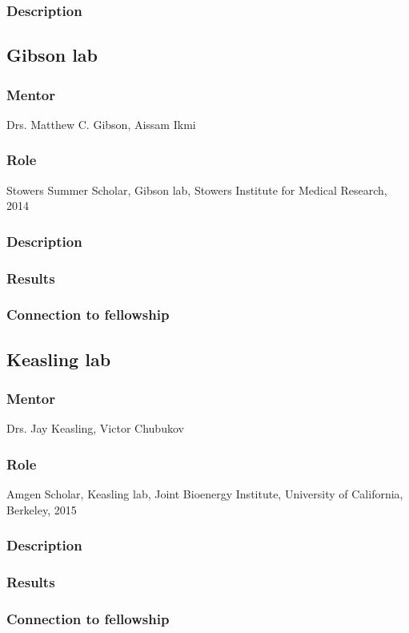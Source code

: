 \documentclass[11pt]{article}
\begin{document}
\subsubsection{Description}
%
\subsection{Gibson lab}
%
\subsubsection{Mentor}
Drs. Matthew C. Gibson, Aissam Ikmi
%
\subsubsection{Role}
Stowers Summer Scholar, Gibson lab, Stowers Institute for Medical Research, 2014
%
\subsubsection{Description}
%
\subsubsection{Results}
%
\subsubsection{Connection to fellowship}
%
\subsection{Keasling lab}
\begin{refsection}
%
\subsubsection{Mentor}
Drs. Jay Keasling, Victor Chubukov
%
\subsubsection{Role}
Amgen Scholar, Keasling lab, Joint Bioenergy Institute, University of California, Berkeley, 2015
%
\subsubsection{Description}
%
\subsubsection{Results}
%
\subsubsection{Connection to fellowship}
%
\nocite{Chubukov2017-uu}
\printbibliography[heading=none]
\end{refsection}
%
\end{document}
